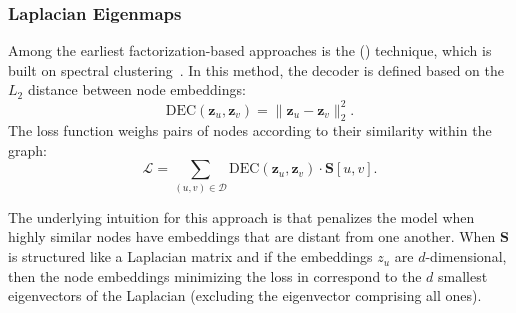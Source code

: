 \subsubsection{Laplacian Eigenmaps}
Among the earliest factorization-based approaches is the  () technique, which is built on spectral clustering~\cite{Belkin2001laplacianEigenmapsSpectralClusteringTechniquesEmbeddingClustering}. In this method, the decoder is defined based on the $ L_2 $ distance between node embeddings:
\begin{equation*}
    \text{DEC}(\mathbf{z}_u, \mathbf{z}_v) = \|\mathbf{z}_u - \mathbf{z}_v\|_2^2.
\end{equation*}
The loss function weighs pairs of nodes according to their similarity within the graph:
\begin{equation}\label{eq:laplacianEigenmaploss}
    \mathcal{L} = \sum_{(u,v)\in\mathcal{D}} \text{DEC}(\mathbf{z}_u, \mathbf{z}_v) \cdot \textbf{S}[u,v].
\end{equation}

The underlying intuition for this approach is that  penalizes the model when highly similar nodes have embeddings that are distant from one another. When $ \mathbf{S} $ is structured like a Laplacian matrix and if the embeddings $ z_u $ are $ d $-dimensional, then the node embeddings minimizing the loss in  correspond to the $ d $ smallest eigenvectors of the Laplacian (excluding the eigenvector comprising all ones).


